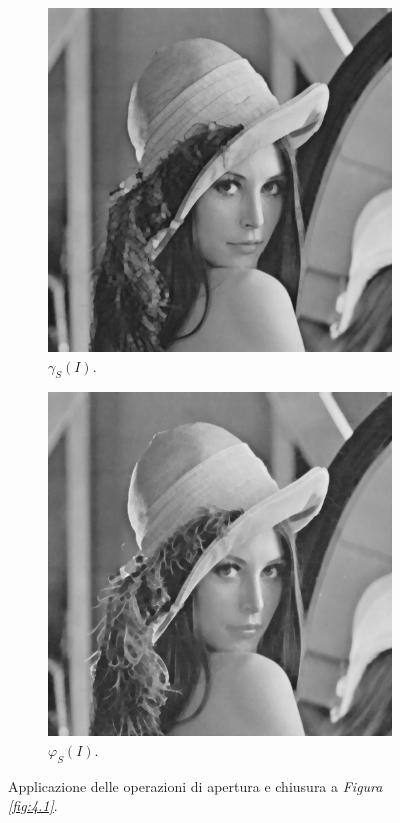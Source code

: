 \documentclass{subfiles}
\begin{document}
\begin{figure}[!h]
    \centering
    \begin{subfigure}[b]{0.425\textwidth}
        \centering
        \includegraphics[scale = 0.325]{../Images/Lena/Open Lena.png}
        \caption{\(\gamma_{S}(I)\).}
    \end{subfigure}
    \hspace{10pt}
    \begin{subfigure}[b]{0.425\textwidth}
        \centering
        \includegraphics[scale = 0.325]{../Images/Lena/Close Lena.png}
        \caption{\(\varphi_{S}(I)\).}
    \end{subfigure}
    \caption{Applicazione delle operazioni di apertura e chiusura a \emph{Figura \ref{fig:4.1}}.}
    \label{fig:7.2}
\end{figure}
\end{document}
